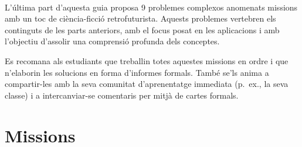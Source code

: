 \ \\[-9cm]
L'última part d'aquesta guia proposa 9 problemes complexos anomenats missions
amb un toc de ciència-ficció retrofuturista. Aquests problemes vertebren els continguts de les
parts anteriors, amb el focus posat en les aplicacions i amb l'objectiu d'assolir una comprensió profunda dels conceptes.

Es recomana als estudiants que treballin totes aquestes missions en ordre i que n'elaborin les solucions
en forma d'informes formals. També se'ls anima a compartir-les amb la seva
comunitat d'aprenentatge immediata (p.\ ex., la seva classe) i a intercanviar-se comentaris
per mitjà de cartes formals.


\chapter{Missions}

